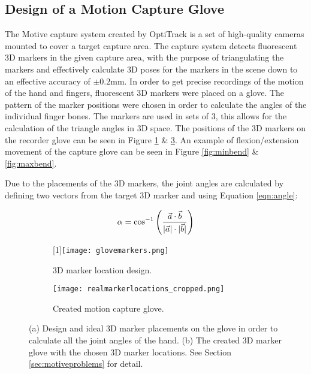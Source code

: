 \documentclass[../main.tex]{subfiles}
\begin{document}
\subsection{Design of a Motion Capture Glove}
\label{sec:motiveglove}

The Motive capture system created by OptiTrack \cite{motive} is a set of high-quality cameras mounted to cover a target capture area.
The capture system detects fluorescent 3D markers in the given capture area, with the purpose of triangulating the markers and effectively calculate 3D poses for the markers in the scene down to an effective accuracy of $\pm 0.2$mm.
In order to get precise recordings of the motion of the hand and fingers, fluorescent 3D markers were placed on a glove.
The pattern of the marker positions were chosen in order to calculate the angles of the individual finger bones.
The markers are used in sets of 3, this allows for the calculation of the triangle angles in 3D space.
The positions of the 3D markers on the recorder glove can be seen in Figure \ref{fig:markerdesign} \& \ref{fig:realmarkers}.
An example of \gls{flexion/extension} movement of the capture glove can be seen in Figure \ref{fig:minbend} \& \ref{fig:maxbend}.

Due to the placements of the 3D markers, the joint angles are calculated by defining two vectors from the target 3D marker and using Equation \eqref{eqn:angle}:

\begin{equation}
\label{eqn:angle}
\alpha = \cos^{-1}\left({\frac{\vec{a} \cdot \vec{b}}{ \lvert \vec{a} \rvert \cdot \lvert \vec{b} \rvert }}\right)
\end{equation}


\begin{figure}[H]
    \centering
    \begin{subfigure}[b]{0.49\textwidth}
        \centering
        \scalebox{-1}[1]{\texttt{[image: glovemarkers.png]}}
        \caption{3D marker location design.}
        \label{fig:markerdesign}
    \end{subfigure}
    \hfill
    \centering
    \begin{subfigure}[b]{0.49\textwidth}
        \centering
        \texttt{[image: realmarkerlocations\_cropped.png]}
        \caption{Created motion capture glove.}
        \label{fig:realmarkers}
    \end{subfigure}
    \caption{(a) Design and ideal 3D marker placements on the glove in order to calculate all the joint angles of the hand. (b) The created 3D marker glove with the chosen 3D marker locations. See Section \ref{sec:motiveproblems} for detail.}
\end{figure}
\end{document}
